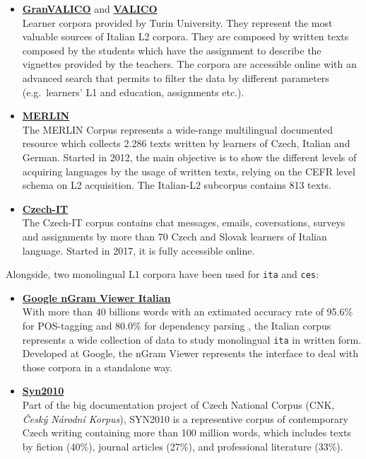 \documentclass[a4paper,twoside,12pt,chapterprefix=false,listof=flat]{scrartcl}
\theoremstyle{plain} %
\theoremstyle{definition}
\theoremstyle{remark}
\begin{document}
\begin{itemize}
\item
  \textbf{\href{http://www.valico.org/valico_b_CORPUS.html}{GranVALICO}}
  and \textbf{\href{http://www.valico.org/valico_CORPUS.html}{VALICO}}
  \citep{valico}\\
  Learner corpora provided by Turin University. They represent the most
  valuable sources of Italian L2 corpora. They are composed by written
  texts composed by the students which have the assignment to describe
  the vignettes provided by the teachers. The corpora are accessible
  online with an advanced search that permits to filter the data by
  different parameters (e.g.~learners' L1 and education, assignments
  etc.).
\item
  \textbf{\href{http://merlin-platform.eu}{MERLIN}} \citep{merlin}\\
  The MERLIN Corpus represents a wide-range multilingual documented
  resource which collects 2.286 texts written by learners of Czech,
  Italian and German. Started in 2012, the main objective is to show the
  different levels of acquiring languages by the usage of written texts,
  relying on the CEFR level schema on L2 acquisition. The Italian-L2
  subcorpus contains 813 texts.
\item
  \textbf{\href{http://czech-it.github.io}{Czech-IT}} \citep{czech-it}\\
  The Czech-IT corpus contains chat messages, emails, coversations,
  surveys and assignments by more than 70 Czech and Slovak learners of
  Italian language. Started in 2017, it is fully accessible online.
\end{itemize}

Alongside, two monolingual L1 corpora have been used for \texttt{ita}
and \texttt{ces}:

\begin{itemize}
\item
  \textbf{\href{http://books.google.com/ngrams}{Google nGram Viewer
  Italian}} \citep{ngram2011}\\
  With more than 40 billions words with an extimated accuracy rate of
  95.6\% for POS-tagging and 80.0\% for dependency parsing
  \citep{ngram2012}, the Italian corpus represents a wide collection of
  data to study monolingual \texttt{ita} in written form. Developed at
  Google, the nGram Viewer represents the interface to deal with those
  corpora in a standalone way.
\item
  \textbf{\href{http://ucnk.korpus.cz/syn2010.php}{Syn2010}}
  \citep{syn2010}\\
  Part of the big documentation project of Czech National Corpus (CNK,
  \emph{Český Národní Korpus}), SYN2010 is a representive corpus of
  contemporary Czech writing containing more than 100 million words,
  which includes texts by fiction (40\%), journal articles (27\%), and
  professional literature (33\%).
\end{itemize}
\end{document}
